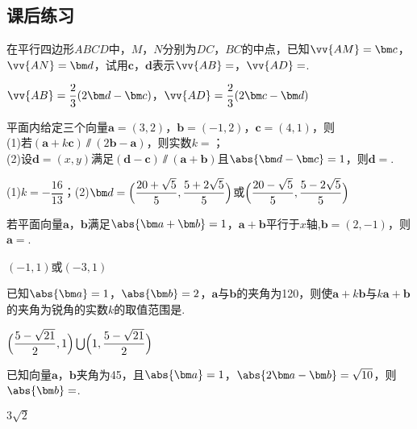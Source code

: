 \begin{Theorem}[平面向量基本定理]
\section{课后练习}
  \begin{exercise}
    \item%
      在平行四边形$ABCD$中，$M$，$N$分别为$DC$，$BC$的中点，已知$\vv{AM}=\bm c$，$\vv{AN}=\bm d$，试用$\bm c$，$\bm d$表示$\vv{AB}=$\tk，$\vv{AD}=$\tk.
      \begin{answer}
        $\vv{AB}=\dfrac{2}3(2\bm d-\bm c)$，$\vv{AD}=\dfrac{2}3(2\bm c-\bm d)$
      \end{answer}
    \item%
      平面内给定三个向量$\bm a=(3,2)$，$\bm b=(-1,2)$，$\bm c=(4,1)$，则\\
      (1)若$(\bm a+k\bm c)\varparallel(2\bm b-\bm a)$，则实数$k=$\tk；\\
      (2)设$\bm d=(x,y)$满足$(\bm d-\bm c) \varparallel (\bm a+\bm b)$且$\abs{\bm d-\bm c}=1$，则$\bm d=$\tk.
      \begin{answer}
        (1)$k=-\dfrac{16}{13}$；(2)$\bm d=\Bigl(\dfrac{20+\sqrt{5}}5,\dfrac{5+2\sqrt{5}}5\Bigr)$或$\Bigl(\dfrac{20-\sqrt{5}}5,\dfrac{5-2\sqrt{5}}5\Bigr)$
      \end{answer}
    \item%
      若平面向量$\bm a$，$\bm b$满足$\abs{\bm a+\bm b}=1$，$\bm a+\bm b$平行于$x$轴,$\bm b=(2,-1)$，则$\bm a=$\tk.
      \begin{answer}
        $(-1,1)$或$(-3,1)$
      \end{answer}
    \item%
      已知$\abs{\bm a}=1$，$\abs{\bm b}=2$，$\bm a$与$\bm b$的夹角为120\degree，则使$\bm a+k\bm b$与$k\bm a+\bm b$的夹角为锐角的实数$k$的取值范围是\tk.
      \begin{answer}
        $\Bigl(\dfrac{5-\sqrt{21}}2,1\Bigr) \bigcup \Bigl(1,\dfrac{5-\sqrt{21}}2 \Bigr)$
      \end{answer}
    \item%
      已知向量$\bm a$，$\bm b$夹角为45\degree，且$\abs{\bm a}=1$，$\abs{2\bm a-\bm b}=\sqrt{10}$，则$\abs{\bm b}=$\tk.
      \begin{answer}
        $3\sqrt{2}$
      \end{answer}
    \item%

\end{exercise}
\end{Theorem}
